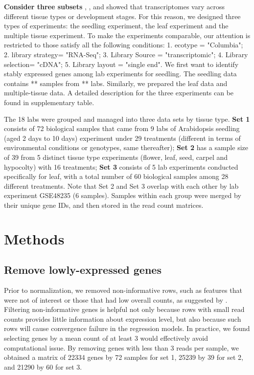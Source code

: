 \documentclass[11pt, a4paper]{article}
\begin{document}
\textbf{Consider three subsets} 
\cite{czechowski2005genome}, \cite{hruz2011refgenes}, and
\cite{dekkers2012identification} showed that transcriptomes vary across
different tissue types or development stages. For this reason, we designed three 
types of experiments: the seedling experiment, the leaf experiment and the multiple tissue
experiment. To make the experiments comparable, our attention is restricted to those satisfy all the following conditions:  1. ecotype = "Columbia"; 2. library strategy= "RNA-Seq"; 3. Library Source = "transcriptomic"; 4. Library selection= "cDNA"; 5. Library layout = "single end". 
We first want to identify stably expressed genes among lab experiments for seedling. The seedling data contains  **  samples from ** labs.
Similarly, we prepared the leaf data and multiple-tissue data.  A detailed description for the three experiments can be found in supplementary table. 


The 18 labs were grouped and managed into three data sets by tissue type.
\textbf{Set 1} consists of 72 biological
samples that came from 9 labs of Arabidopsis seedling (aged 2 days to 10 days)
experiment under 29 treatments (different in terms of environmental conditions
or genotypes, same thereafter); \textbf{Set 2} has a sample size of 39 from 5
distinct tissue type experiments (flower, leaf, seed, carpel and hypocolty)
with 16 treatments; \textbf{Set 3} consists of 5 lab experiments conducted
specifically for leaf, with a total number of 60 biological samples among 28
different treatments. Note that  Set 2 and Set 3 overlap with each other by
lab experiment GSE48235 (6 samples). Samples within each group were merged by
their unique gene IDs, and then stored in the read count matrices.  \\




\section{Methods}
\subsection{Remove lowly-expressed genes} Prior to normalization, we removed non-informative rows, such as features that were not of interest or those that had low overall counts, as suggested by \cite{anders2013count}. Filtering non-informative genes is helpful not only because rows with small read counts provides little information about expression level,  but also because such rows will cause convergence failure in the regression models. In practice,  we found selecting genes by a mean count of at least 3 would effectively avoid computational issue.  By removing genes with less than 3 reads per sample, we obtained a matrix of 22334 genes by 72 samples for set 1, 25239 by 39 for set 2, and 21290 by 60  for set 3.  
\end{document}
